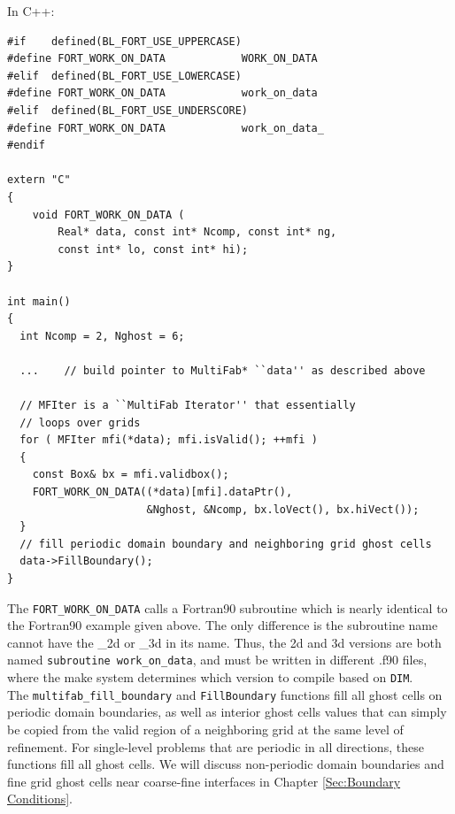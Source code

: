 In C++:
\begin{lstlisting}[backgroundcolor=\color{light-blue}]
#if    defined(BL_FORT_USE_UPPERCASE)
#define FORT_WORK_ON_DATA            WORK_ON_DATA
#elif  defined(BL_FORT_USE_LOWERCASE)
#define FORT_WORK_ON_DATA            work_on_data
#elif  defined(BL_FORT_USE_UNDERSCORE)
#define FORT_WORK_ON_DATA            work_on_data_
#endif

extern "C"
{
    void FORT_WORK_ON_DATA (
        Real* data, const int* Ncomp, const int* ng,
        const int* lo, const int* hi);
}

int main()
{
  int Ncomp = 2, Nghost = 6;

  ...    // build pointer to MultiFab* ``data'' as described above
  
  // MFIter is a ``MultiFab Iterator'' that essentially
  // loops over grids
  for ( MFIter mfi(*data); mfi.isValid(); ++mfi )
  {
    const Box& bx = mfi.validbox();
    FORT_WORK_ON_DATA((*data)[mfi].dataPtr(),
                      &Nghost, &Ncomp, bx.loVect(), bx.hiVect());
  }
  // fill periodic domain boundary and neighboring grid ghost cells
  data->FillBoundary();
}
\end{lstlisting}
The {\tt FORT\_WORK\_ON\_DATA} calls a Fortran90 subroutine which is nearly
identical to the Fortran90 example given above.  The only difference is the subroutine
name cannot have the \_2d or \_3d in its name.  Thus, the 2d and 3d versions
are both named {\tt subroutine work\_on\_data}, and must be written in
different .f90 files, where the make system determines which version to compile
based on {\tt DIM}.\\

The {\tt multifab\_fill\_boundary} and {\tt FillBoundary} functions 
fill all ghost cells on periodic domain boundaries, as well as interior
ghost cells values that can simply be copied from the valid region of a neighboring
grid at the same level of refinement.  For single-level problems that are periodic
in all directions, these functions fill all ghost cells.  We will discuss
non-periodic domain boundaries and fine grid ghost cells near coarse-fine interfaces
in Chapter \ref{Sec:Boundary Conditions}.


